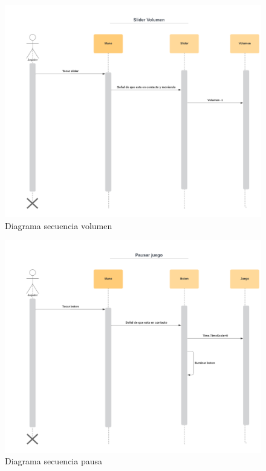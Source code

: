 \documentclass[12pt]{article} %
\begin{document}
\begin{figure}  [!htb]
  \includegraphics[width=\linewidth]{Diagrama secuencia volumen.png}
  \caption{Diagrama secuencia volumen}
\end{figure}

\begin{figure}  [!htb]
  \includegraphics[width=\linewidth]{Diagrama secuencia pausa.png}
  \caption{Diagrama secuencia pausa}
\end{figure}
\end{document}
